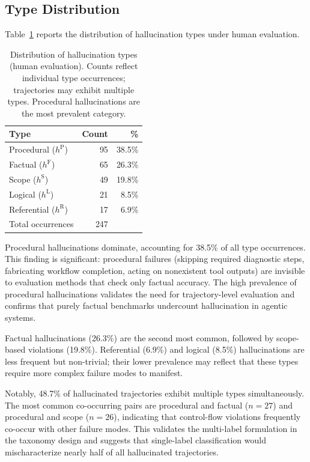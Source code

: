 \documentclass{article}
\begin{document}
\subsection{Type Distribution}
\label{app:type_distribution}

Table~\ref{tab:type_distribution} reports the distribution of hallucination types under human evaluation.

\begin{table}[t]
\caption{Distribution of hallucination types (human evaluation). Counts reflect individual type occurrences; trajectories may exhibit multiple types. Procedural hallucinations are the most prevalent category.}
\label{tab:type_distribution}
\centering
\small
\begin{tabular}{lrr}
\toprule
\textbf{Type} & \textbf{Count} & \textbf{\%} \\
\midrule
Procedural ($h^{\text{P}}$)   & 95  & 38.5\% \\
Factual ($h^{\text{F}}$)      & 65  & 26.3\% \\
Scope ($h^{\text{S}}$)        & 49  & 19.8\% \\
Logical ($h^{\text{L}}$)      & 21  & 8.5\%  \\
Referential ($h^{\text{R}}$)  & 17  & 6.9\%  \\
\midrule
Total occurrences              & 247 &        \\
\bottomrule
\end{tabular}
\end{table}

Procedural hallucinations dominate, accounting for 38.5\% of all type occurrences. This finding is significant: procedural failures (skipping required diagnostic steps, fabricating workflow completion, acting on nonexistent tool outputs) are invisible to evaluation methods that check only factual accuracy. The high prevalence of procedural hallucinations validates the need for trajectory-level evaluation and confirms that purely factual benchmarks undercount hallucination in agentic systems.

Factual hallucinations (26.3\%) are the second most common, followed by scope-based violations (19.8\%). Referential (6.9\%) and logical (8.5\%) hallucinations are less frequent but non-trivial; their lower prevalence may reflect that these types require more complex failure modes to manifest.

Notably, 48.7\% of hallucinated trajectories exhibit multiple types simultaneously. The most common co-occurring pairs are procedural and factual ($n = 27$) and procedural and scope ($n = 26$), indicating that control-flow violations frequently co-occur with other failure modes. This validates the multi-label formulation in the taxonomy design and suggests that single-label classification would mischaracterize nearly half of all hallucinated trajectories.
\end{document}
